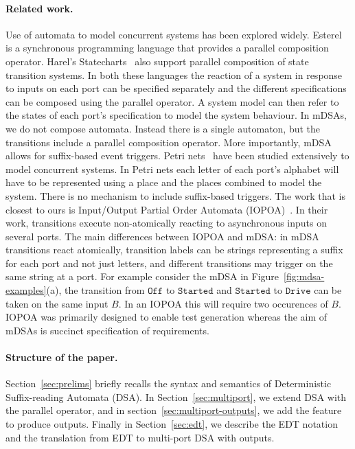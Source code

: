 \paragraph*{Related work.}
Use of automata to model concurrent systems has been explored widely.
Esterel~\cite{DBLP:journals/scp/BerryG92} is a synchronous programming language
that provides a parallel composition operator. Harel's
Statecharts~\cite{DBLP:journals/scp/Harel87} also support parallel composition
of state transition systems. In both these languages the reaction of a system
in response to inputs on each port can be specified separately and the
different specifications can be composed using the parallel operator. A system
model can then refer to the states of each port's specification to model the
system behaviour. In mDSAs, we do not compose automata. Instead there is a single automaton, but the transitions include a parallel composition operator. More importantly, mDSA allows for suffix-based event triggers. %
Petri nets~\cite{CAPetri}
have been studied extensively to model concurrent systems. In Petri nets each
letter of each port's alphabet will have to be represented using a place and
the places combined to model the system. There is no mechanism to include suffix-based triggers. %
The work that is closest to ours is Input/Output Partial Order
Automata (IOPOA)~\cite{10.5555/2391293.2391305}. In their work, transitions
execute non-atomically reacting to asynchronous inputs on several ports. The
main differences between IOPOA and mDSA: in mDSA transitions react
atomically, transition labels can be strings representing a suffix for each port and not just letters,
and different transitions may trigger on the same string at a port. For example consider the mDSA in Figure~\ref{fig:mdsa-examples}(a), the transition from $\mathtt{Off}$ to $\mathtt{Started}$ and $\mathtt{Started}$ to $\mathtt{Drive}$ can be taken on the same input $B$. In an IOPOA this will require two occurences of $B$. IOPOA was primarily designed to enable test generation whereas the aim of mDSAs is succinct specification of requirements.

\paragraph*{Structure of the paper.} Section~\ref{sec:prelims} briefly recalls the syntax and semantics of Deterministic Suffix-reading Automata (DSA). In Section~\ref{sec:multiport}, we extend DSA with the parallel operator, and in section~\ref{sec:multiport-outputs}, we add the feature to produce outputs. Finally in Section~\ref{sec:edt}, we describe the EDT notation and the translation from EDT to multi-port DSA with outputs. 